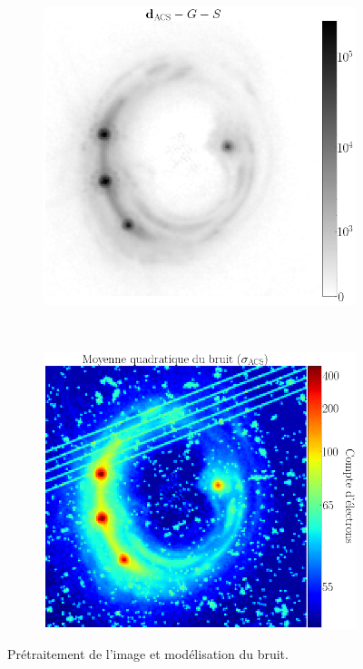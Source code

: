 \documentclass[times,10pt,twocolumn]{article}
\begin{document}
\begin{figure}[ht]
        \centering
        \begin{subfigure}[b]{0.45\linewidth}
                \includegraphics[width=\linewidth]{after_galfit} 
                \caption{
        }
                \label{fig:after_galfit}
        \end{subfigure}
        ~
        \begin{subfigure}[b]{0.48\linewidth}
                \includegraphics[width=\linewidth]{noise_map}
                \caption{
        }
                \label{fig:noise_map}
        \end{subfigure}
        \caption{Prétraitement de l'image et modélisation du bruit.}
\end{figure}
\end{document}

